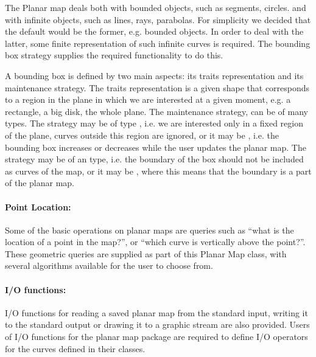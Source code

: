 The Planar map deals both with bounded objects, such as segments, circles.
and with infinite objects, such as lines, rays, parabolas.
For simplicity we decided that the default would be the former, e.g. bounded objects.
In order to deal with the latter, some finite representation of such infinite curves is required. The bounding box strategy supplies the required functionality to do this.

A bounding box is defined by two main aspects: its traits representation and its maintenance strategy.
The traits representation is a given shape that corresponds to a region in the plane in which we are interested at a given moment, e.g. a rectangle, a big disk, the whole plane.
The maintenance strategy, can be of many types. The strategy may be of  type , i.e. we are interested only in a fixed region of the plane, curves outside this region are ignored, or it may be , i.e. the bounding box increases or decreases while the user updates the planar map.
The strategy may be of an  type, i.e. the boundary of the box should not be included as curves of the map, or it may be , where this means that the boundary is a part of the planar map.

\paragraph{Point Location:}

Some of the basic operations on planar maps are queries such as ``what is the location of a point in the map?'', or ``which curve is vertically above the point?''.
These geometric queries are supplied as part of this Planar Map class, with 
several algorithms available for the user to choose from.

\paragraph{I/O functions:}
I/O functions for reading a saved planar map from the standard input, 
writing it to the standard output or drawing it to a graphic stream are also provided.
Users of I/O functions for the planar map package are required to define I/O 
operators for the curves defined in their  classes.



